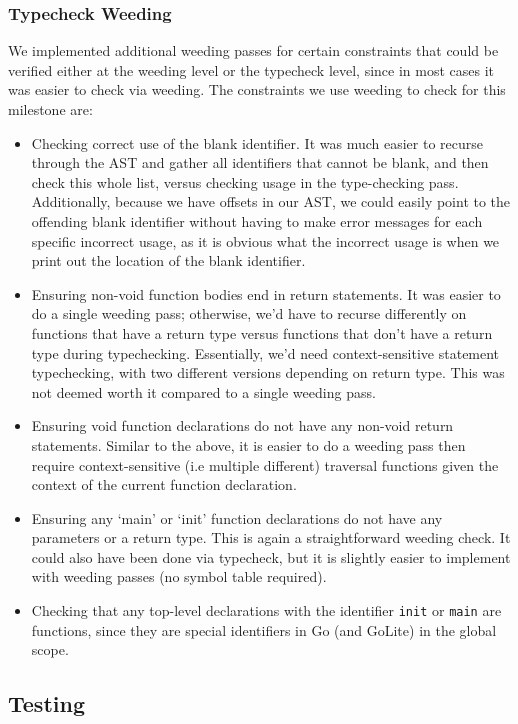 \documentclass[11pt]{article}
\begin{document}
\subsubsection{Typecheck Weeding}
We implemented additional weeding passes for certain constraints that
could be verified either at the weeding level or the typecheck level,
since in most cases it was easier to check via weeding. The
constraints we use weeding to check for this milestone are:
\begin{itemize}
\item Checking correct use of the blank identifier. It was much easier
  to recurse through the AST and gather all identifiers that cannot be
  blank, and then check this whole list, versus checking usage in the
  type-checking pass. Additionally, because we have offsets in our
  AST, we could easily point to the offending blank identifier without
  having to make error messages for each specific incorrect usage, as
  it is obvious what the incorrect usage is when we print out the
  location of the blank identifier.
\item Ensuring non-void function bodies end in return statements. It
  was easier to do a single weeding pass; otherwise, we'd have to
  recurse differently on functions that have a return type versus
  functions that don't have a return type during
  typechecking. Essentially, we'd need context-sensitive statement
  typechecking, with two different versions depending on return
  type. This was not deemed worth it compared to a single weeding
  pass.
\item Ensuring void function declarations do not have any non-void
  return statements. Similar to the above, it is easier to do a
  weeding pass then require context-sensitive (i.e multiple different)
  traversal functions given the context of the current function
  declaration.
\item Ensuring any `main' or `init' function declarations do not have
  any parameters or a return type. This is again a straightforward
  weeding check.  It could also have been done via typecheck, but it
  is slightly easier to implement with weeding passes (no symbol table
  required).
\item Checking that any top-level declarations with the identifier
  \texttt{init} or \texttt{main} are functions, since they are special
  identifiers in Go (and GoLite) in the global scope.
\end{itemize}

\subsection{Testing}
\end{document}
